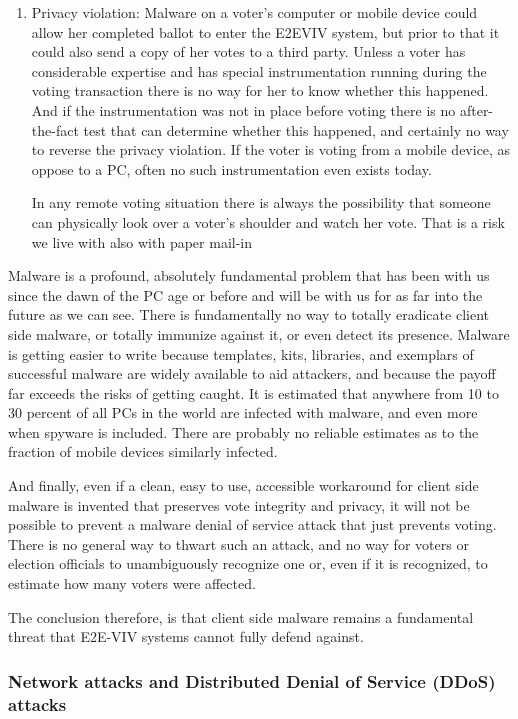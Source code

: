 \begin{enumerate}[label={\roman*})]
\item Privacy violation: Malware on a voter's computer or mobile
  device could allow her completed ballot to enter the E2EVIV system,
  but prior to that it could also send a copy of her votes to a third
  party. Unless a voter has considerable expertise and has special
  instrumentation running during the voting transaction there is no
  way for her to know whether this happened. And if the
  instrumentation was not in place before voting there is no
  after-the-fact test that can determine whether this happened, and
  certainly no way to reverse the privacy violation. If the voter is
  voting from a mobile device, as oppose to a PC, often no such
  instrumentation even exists today.

  In any remote voting situation there is always the possibility that
  someone can physically look over a voter's shoulder and watch her
  vote. That is a risk we live with also with paper mail-in
\end{enumerate}

Malware is a profound, absolutely fundamental problem that has been
with us since the dawn of the PC age or before and will be with us for
as far into the future as we can see. There is fundamentally no way to
totally eradicate client side malware, or totally immunize against it,
or even detect its presence. Malware is getting easier to write
because templates, kits, libraries, and exemplars of successful
malware are widely available to aid attackers, and because the payoff
far exceeds the risks of getting caught. It is estimated that anywhere
from 10 to 30 percent of all PCs in the world are infected with
malware, and even more when spyware is included. There are probably no
reliable estimates as to the fraction of mobile devices similarly
infected. 

And finally, even if a clean, easy to use, accessible workaround for
client side malware is invented that preserves vote integrity and
privacy, it will not be possible to prevent a malware denial of
service attack that just prevents voting. There is no general way to
thwart such an attack, and no way for voters or election officials to
unambiguously recognize one or, even if it is recognized, to estimate
how many voters were affected.

The conclusion therefore, is that client side malware remains a
fundamental threat that E2E-VIV systems cannot fully defend against. 

\subsubsection{Network attacks and Distributed Denial of Service
  (DDoS) attacks}

